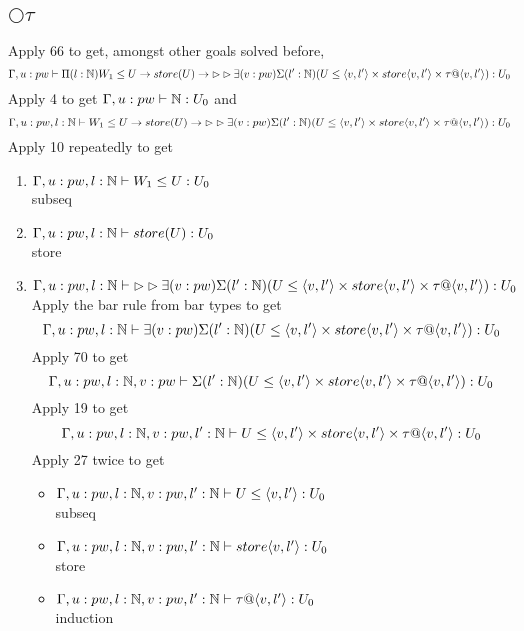 \documentclass{article}
\begin{document}
    \subsection{$\bigcirc \tau$}
    Apply 66 to get, amongst other goals solved before,
    \[\Gamma, u: pw \vdash \Pi(l : \mathbb{N}) W_1 \leq U \rightarrow store(U) \rightarrow \rhd \rhd \exists(v: pw)\Sigma(l' : \mathbb{N})(U \leq \langle v, l' \rangle \times store\langle v, l' \rangle \times \tau @ \langle v, l' \rangle): U_0 \]
    Apply 4 to get $ \Gamma, u: pw \vdash \mathbb{N} : U_0$ and 
    \[\Gamma, u: pw, l : \mathbb{N} \vdash W_1 \leq U \rightarrow store(U) \rightarrow \rhd \rhd \exists(v: pw)\Sigma(l' : \mathbb{N})(U \leq \langle v, l' \rangle \times store\langle v, l' \rangle \times \tau @ \langle v, l' \rangle): U_0\]
   Apply 10 repeatedly to get
   \begin{enumerate}
       \item $\Gamma, u: pw, l : \mathbb{N} \vdash W_1 \leq U : U
       _0$\\
       subseq
       \item $\Gamma, u: pw, l : \mathbb{N} \vdash store(U) : U_0$\\
       store
       \item $\Gamma, u: pw, l : \mathbb{N} \vdash \rhd \rhd \exists(v: pw)\Sigma(l' : \mathbb{N})(U \leq \langle v, l' \rangle \times store\langle v, l' \rangle \times \tau @ \langle v, l' \rangle) : U_0$\\
       Apply the bar rule from bar types to get
       \[\Gamma, u: pw, l : \mathbb{N} \vdash  \exists(v: pw)\Sigma(l' : \mathbb{N})(U \leq \langle v, l' \rangle \times store\langle v, l' \rangle \times \tau @ \langle v, l' \rangle) : U_0\]
       Apply 70 to get 
       \[\Gamma, u: pw, l : \mathbb{N} , v: pw \vdash \Sigma(l' : \mathbb{N})(U \leq \langle v, l' \rangle \times store\langle v, l' \rangle \times \tau @ \langle v, l' \rangle) : U_0\]
       Apply 19 to get
        \[\Gamma, u: pw, l : \mathbb{N} , v: pw , l' : \mathbb{N} \vdash U \leq \langle v, l' \rangle \times store\langle v, l' \rangle \times \tau @ \langle v, l' \rangle : U_0\]
        Apply 27 twice to get
        \begin{itemize}
            \item  $\Gamma, u: pw, l : \mathbb{N} , v: pw , l' : \mathbb{N} \vdash U \leq \langle v, l' \rangle : U_0$\\
            subseq
            \item $\Gamma, u: pw, l : \mathbb{N} , v: pw , l' : \mathbb{N} \vdash store\langle v, l' \rangle : U_0$ \\
            store
            \item $\Gamma, u: pw, l : \mathbb{N} , v: pw , l' : \mathbb{N} \vdash \tau @ \langle v, l' \rangle : U_0$\\
            induction
        \end{itemize}
        

\end{enumerate}
\end{document}

